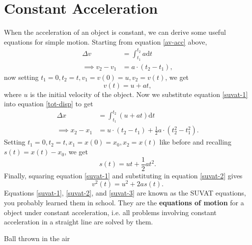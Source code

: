 \documentclass[../classical_mechanics.tex]{subfiles}
\begin{document}
    \section{Constant Acceleration}
        \paragraph{}
        When the acceleration of an object is constant, we can derive some useful equations for simple motion.
        Starting from equation \ref{av-acc} above,
        \begin{align*}
            \Delta v&=\int_{t_1}^{t_2}a\mathrm{d}t\\
            \implies v_2-v_1&=a\cdot(t_2-t_1),
        \end{align*}
        now setting $t_1=0,t_2=t,v_1=v(0)=u,v_2=v(t)$, we get
        \begin{equation}\label{suvat-1}
            v(t)=u+at,
        \end{equation}
        where $u$ is the initial velocity of the object.
        Now we substitute equation \ref{suvat-1} into equation \ref{tot-disp} to get
        \begin{align*}
            \Delta x&=\int_{t_1}^{t_2}(u+at)\mathrm{d}t\\
            \implies x_2-x_1&=u\cdot(t_2-t_1)+\frac{1}{2}a\cdot(t_2^2-t_1^2).
        \end{align*}
        Setting $t_1=0,t_2=t,x_1=x(0)=x_0,x_2=x(t)$ like before and recalling $s(t)=x(t)-x_0$, we get
        \begin{equation}\label{suvat-2}
            s(t)=ut+\frac{1}{2}at^2.
        \end{equation}
        Finally, squaring equation \ref{suvat-1} and substituting in equation \ref{suvat-2} gives
        \begin{equation}\label{suvat-3}
            v^2(t)=u^2+2as(t).
        \end{equation}
        Equations \ref{suvat-1}, \ref{suvat-2}, and \ref{suvat-3} are known as the SUVAT equations, you probably learned them in school.
        They are the \textbf{equations of motion} for a object under constant acceleration, i.e. all problems involving constant acceleration in a straight line are solved by them.
        \begin{example}
            Ball thrown in the air %
        \end{example}
\end{document}
